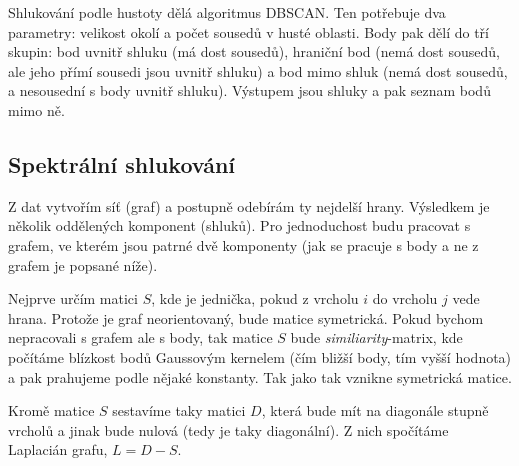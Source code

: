 \documentclass[10pt,a4paper]{article}
\begin{document}
Shlukování podle hustoty dělá algoritmus DBSCAN. Ten potřebuje dva parametry: velikost okolí a počet sousedů v husté oblasti. Body pak dělí do tří skupin: bod uvnitř shluku (má dost sousedů), hraniční bod (nemá dost sousedů, ale jeho přímí sousedi jsou uvnitř shluku) a bod mimo shluk (nemá dost sousedů, a nesousední s body uvnitř shluku). Výstupem jsou shluky a pak seznam bodů mimo ně.

\subsection{Spektrální shlukování}

Z dat vytvořím síť (graf) a postupně odebírám ty nejdelší hrany. Výsledkem je několik oddělených komponent (shluků). Pro jednoduchost budu pracovat s grafem, ve kterém jsou patrné dvě komponenty (jak se pracuje s body a ne z grafem je popsané níže).

\begin{figure}[ht!]
\centering
{}
\end{figure}

Nejprve určím matici $S$, kde je jednička, pokud z vrcholu $i$ do vrcholu $j$ vede hrana. Protože je graf neorientovaný, bude matice symetrická. Pokud bychom nepracovali s grafem ale s body, tak matice $S$ bude \textit{similiarity}-matrix, kde počítáme blízkost bodů Gaussovým kernelem (čím bližší body, tím vyšší hodnota) a pak prahujeme podle nějaké konstanty. Tak jako tak vznikne symetrická matice.

Kromě matice $S$ sestavíme taky matici $D$, která bude mít na diagonále stupně vrcholů a jinak bude nulová (tedy je taky diagonální). Z nich spočítáme Laplacián grafu, $L = D - S$.
\end{document}
